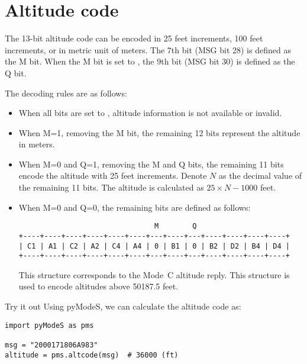 


\section{Altitude code} \label{sec:alt_code}

The 13-bit altitude code can be encoded in 25 feet increments, 100 feet increments, or in metric unit of meters. The 7th bit (MSG bit 28) is defined as the M bit. When the M bit is set to \0, the 9th bit (MSG bit 30) is defined as the Q bit.

The decoding rules are as follows:

\begin{itemize}
  \item When all bits are set to \0, altitude information is not available or invalid.

  \item When M=1, removing the M bit, the remaining 12 bits represent the altitude in meters.

  \item When M=0 and Q=1, removing the M and Q bits, the remaining 11 bits encode the altitude with 25 feet increments. Denote $N$ as the decimal value of the remaining 11 bits. The altitude is calculated as $25 \times N - 1000$ feet.

  \item When M=0 and Q=0, the remaining bits are defined as follows:

\begin{verbatim}
                                M        Q
+----+----+----+----+----+----+---+----+---+----+----+----+----+
| C1 | A1 | C2 | A2 | C4 | A4 | 0 | B1 | 0 | B2 | D2 | B4 | D4 |
+----+----+----+----+----+----+---+----+---+----+----+----+----+
\end{verbatim}

  This structure corresponds to the Mode~C altitude reply. This structure is used to encode altitudes above 50187.5 feet.

\end{itemize}

\begin{notebox}{Try it out}
Using pyModeS, we can calculate the altitude code as: 

\begin{verbatim}
import pyModeS as pms

msg = "2000171806A983"
altitude = pms.altcode(msg)  # 36000 (ft)
\end{verbatim}

\end{notebox}



